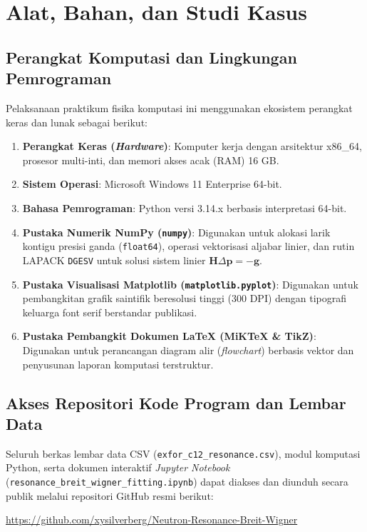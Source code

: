 \section{Alat, Bahan, dan Studi Kasus}

\subsection*{Perangkat Komputasi dan Lingkungan Pemrograman}
Pelaksanaan praktikum fisika komputasi ini menggunakan ekosistem perangkat keras dan lunak sebagai berikut:
\begin{enumerate}
    \item \textbf{Perangkat Keras (\textit{Hardware})}: Komputer kerja dengan arsitektur x86\_64, prosesor multi-inti, dan memori akses acak (RAM) 16 GB.
    \item \textbf{Sistem Operasi}: Microsoft Windows 11 Enterprise 64-bit.
    \item \textbf{Bahasa Pemrograman}: Python versi 3.14.x berbasis interpretasi 64-bit.
    \item \textbf{Pustaka Numerik NumPy (\texttt{numpy})}: Digunakan untuk alokasi larik kontigu presisi ganda (\texttt{float64}), operasi vektorisasi aljabar linier, dan rutin LAPACK \texttt{DGESV} untuk solusi sistem linier $\mathbf{H}\Delta\mathbf{p} = -\mathbf{g}$.
    \item \textbf{Pustaka Visualisasi Matplotlib (\texttt{matplotlib.pyplot})}: Digunakan untuk pembangkitan grafik saintifik beresolusi tinggi (300 DPI) dengan tipografi keluarga font serif berstandar publikasi.
    \item \textbf{Pustaka Pembangkit Dokumen LaTeX (MiKTeX \& TikZ)}: Digunakan untuk perancangan diagram alir (\textit{flowchart}) berbasis vektor dan penyusunan laporan komputasi terstruktur.
\end{enumerate}

\subsection*{Akses Repositori Kode Program dan Lembar Data}
Seluruh berkas lembar data CSV (\texttt{exfor\_c12\_resonance.csv}), modul komputasi Python, serta dokumen interaktif \textit{Jupyter Notebook} (\texttt{resonance\_breit\_wigner\_fitting.ipynb}) dapat diakses dan diunduh secara publik melalui repositori GitHub resmi berikut:
\begin{center}
    \url{https://github.com/xysilverberg/Neutron-Resonance-Breit-Wigner}
\end{center}

